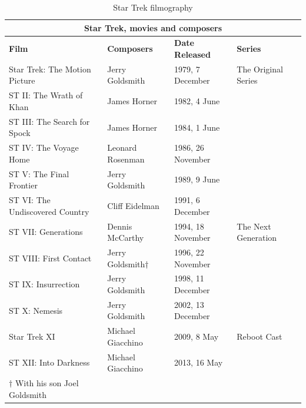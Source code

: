 \begin{table}
\small
\begin{tabularx}{\linewidth}{p{5.2cm} p{3.2cm} l l}
		\multicolumn{4}{c}{Star Trek, movies and composers}\\
\toprule
		\textbf{Film} 					& \textbf{Composers}		& \textbf{Date Released}	& \textbf{Series}		\\
\midrule
		Star Trek: The Motion Picture		& Jerry Goldsmith			& 1979, 7 December 	& The Original Series 	\\
		ST II: The Wrath of Khan  			& James Horner				& 1982, 4 June  		& 					\\
		ST III: The Search for Spock  		& James Horner				& 1984, 1 June 			&  					\\
		ST IV: The Voyage Home				& Leonard Rosenman			& 1986, 26 November 	&  					\\
		ST V: The Final Frontier			& Jerry Goldsmith			& 1989, 9 June 			&  					\\
		ST VI: The Undiscovered Country		& Cliff Eidelman			& 1991, 6 December		&  					\\
		ST VII: Generations					& Dennis McCarthy			& 1994, 18 November		& The Next Generation	\\
		ST VIII: First Contact  			& Jerry Goldsmith\(\dagger\)& 1996, 22 November		&  					\\
		ST IX: Insurrection    				& Jerry Goldsmith			& 1998, 11 December		&  					\\
		ST X: Nemesis     					& Jerry Goldsmith			& 2002, 13 December		&  					\\
		Star Trek XI     					& Michael Giacchino			& 2009, 8 May			& Reboot Cast			\\
		ST XII: Into Darkness  				& Michael Giacchino			& 2013, 16 May			& 					\\
\bottomrule
    \(\dagger\) With his son Joel Goldsmith	&							&					&					\\
\end{tabularx}
    \caption{Star Trek filmography}
    \label{tb:filmography}
\end{table}


